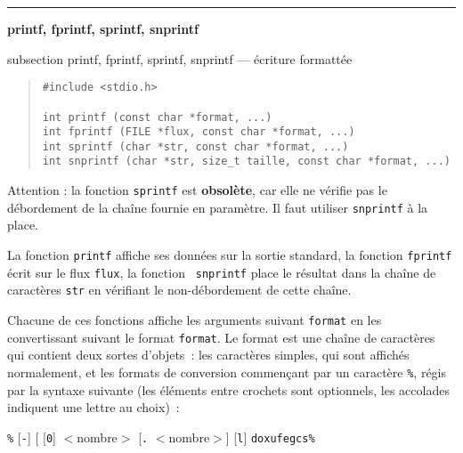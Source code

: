 \documentclass [twoside] {report}
\newcommand {\primitive} [1]
    {
	\phantomsection
	{\large \bf #1}
	\addcontentsline {toc} {subsection} {#1}
    }
\newcommand {\separation}
    {
	\vspace {5mm}
	\nopagebreak
	\hrule
    }
\begin{document}
\separation
\primitive {printf, fprintf, sprintf, snprintf} --- écriture formattée

\begin {quote}
\begin {verbatim}
#include <stdio.h>

int printf (const char *format, ...)
int fprintf (FILE *flux, const char *format, ...)
int sprintf (char *str, const char *format, ...)
int snprintf (char *str, size_t taille, const char *format, ...)
\end{verbatim}
\end {quote}

Attention : la fonction \texttt {sprintf} est \textbf {obsolète}, car elle ne
vérifie pas le débordement de la chaîne fournie en paramètre. Il faut
utiliser \texttt {snprintf} à la place.

La fonction {\tt printf} affiche ses données sur la sortie standard, la
fonction {\tt fprintf} écrit sur le flux {\tt flux}, la fonction {\tt
snprintf} place le résultat dans la chaîne de caractères {\tt str} en
vérifiant le non-débordement de cette chaîne.

Chacune de ces fonctions affiche les arguments suivant {\tt format} en
les convertissant suivant le format {\tt format}.  Le format est une
chaîne de caractères qui contient deux sortes d'objets~:  les caractères
simples, qui sont affichés normalement, et les formats de conversion
commençant par un caractère {\tt \%}, régis par la syntaxe suivante (les
éléments entre crochets sont optionnels, les accolades indiquent une
lettre au choix)~:

{\tt \%} [{\tt -}] [ [{\tt 0}] $<$nombre$>$ [{\tt .} $<$nombre$>$] [{\tt l}] {{ {\tt doxufegcs\%} }}
\end{document}
